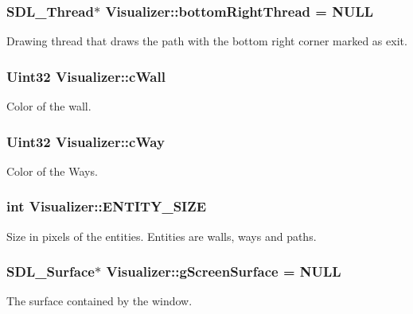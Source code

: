 \subsubsection[{\texorpdfstring{bottom\+Right\+Thread}{bottomRightThread}}]{\setlength{\rightskip}{0pt plus 5cm}S\+D\+L\+\_\+\+Thread$\ast$ Visualizer\+::bottom\+Right\+Thread = N\+U\+LL}\hypertarget{class_visualizer_a27e00041c805a99b433fcea5e0f2b678}{}\label{class_visualizer_a27e00041c805a99b433fcea5e0f2b678}
Drawing thread that draws the path with the bottom right corner marked as exit. 
\subsubsection[{\texorpdfstring{c\+Wall}{cWall}}]{\setlength{\rightskip}{0pt plus 5cm}Uint32 Visualizer\+::c\+Wall}\hypertarget{class_visualizer_aa085df305d7d462052b8b1bc8870c581}{}\label{class_visualizer_aa085df305d7d462052b8b1bc8870c581}
Color of the wall. 
\subsubsection[{\texorpdfstring{c\+Way}{cWay}}]{\setlength{\rightskip}{0pt plus 5cm}Uint32 Visualizer\+::c\+Way}\hypertarget{class_visualizer_a96d89d736020641b4aa7a8153568c143}{}\label{class_visualizer_a96d89d736020641b4aa7a8153568c143}
Color of the Ways. 
\subsubsection[{\texorpdfstring{E\+N\+T\+I\+T\+Y\+\_\+\+S\+I\+ZE}{ENTITY_SIZE}}]{\setlength{\rightskip}{0pt plus 5cm}int Visualizer\+::\+E\+N\+T\+I\+T\+Y\+\_\+\+S\+I\+ZE}\hypertarget{class_visualizer_a2d78c20644f717427431a22a23dbcf6b}{}\label{class_visualizer_a2d78c20644f717427431a22a23dbcf6b}
Size in pixels of the entities. Entities are walls, ways and paths. 
\subsubsection[{\texorpdfstring{g\+Screen\+Surface}{gScreenSurface}}]{\setlength{\rightskip}{0pt plus 5cm}S\+D\+L\+\_\+\+Surface$\ast$ Visualizer\+::g\+Screen\+Surface = N\+U\+LL}\hypertarget{class_visualizer_aa484855f44f50a0dedfe23a53e02b856}{}\label{class_visualizer_aa484855f44f50a0dedfe23a53e02b856}
The surface contained by the window. 
